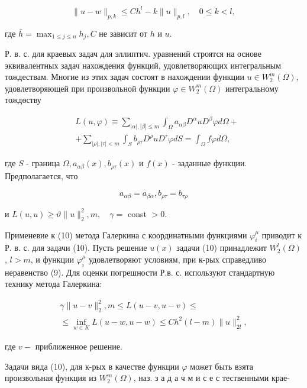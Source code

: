 \documentclass[10pt]{article}
\begin{document}
\[

\|u-w\|_{p, k} \leqslant C \overline{h^{l}}-k\|u\|_{p, l}, \quad 0 \leqslant k<l,

\]



где $\bar{h}=\max _{1 \leqslant j \leqslant n} h_{j}, C$ не зависит от $h$ и $u$.



Р. в. с. для краевых задач для эллиптич. уравнений строятся на основе эквивалентных задач нахождения функций, удовлетворяющих интегральным тождествам. Многие из этих задач состоят в нахождении функции $u \in W_{2}^{m}(\Omega)$, удовлетворяющей при произвольной функции $\varphi \in W_{2}^{m}(\Omega)$ интегральному тождөству



\[

\begin{aligned}

& L(u, \varphi) \equiv \sum_{|\alpha|,|\beta| \leqslant m} \int_{\Omega} a_{\alpha \beta} D^{\alpha} u D^{\beta} \varphi d \Omega+ \\

& +\sum_{|\rho|,|\tau|<m} \int_{S} b_{\rho \tau} D^{\rho} u D^{\tau} \varphi d S=\int_{\Omega} f \varphi d \Omega,

\end{aligned}

\]



где $S$ - граница $\Omega, a_{\alpha \beta}(x), b_{\rho \tau}(x)$ и $f(x)$ - заданные функции. Предполагается, что



\[

a_{\alpha \beta}=a_{\beta \alpha}, b_{\rho \tau}=b_{\tau \rho}

\]



и $L(u, u) \geqslant \vartheta\|u\|_{2}^{2}, m, \quad \gamma=$ const $>0$.



Применевие к (10) метода Галеркина с координатными функциями $\varphi_{i}^{\mu}$ приводит к Р. в. с. для задачи (10). Пусть решение $u(x)$ задачи (10) принадлежит $W_{2}^{l}(\Omega)$, $l>m$, и функции $\varphi_{i}^{\mu}$ удовлетворяют условиям, при к-рых справедливо неравенство (9). Для оценки погрешности Р.в. с. используют стандартную технику метода Галеркина:



\[

\begin{gathered}

\gamma\|u-v\|_{2}^{2}, m \leqslant L(u-v, u-v) \leqslant \\

\leqslant \inf _{w \in K} L(u-w, u-w) \leqslant C h^{2}(l-m)\|u\|_{2 l}^{2},

\end{gathered}

\]



где $v-$ приближенное решение.



Задачи вида (10), для к-рых в качестве функции $\varphi$ может быть взята произвольная функция из $W_{2}^{m}(\Omega)$, наз. з а д а ч м и с е с тественными крае-
\end{document}

